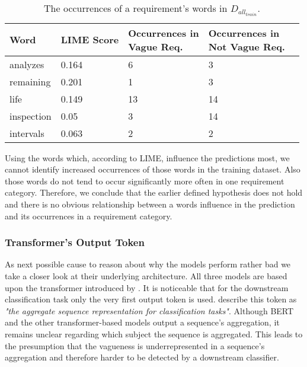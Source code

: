 \begin{table}[htpb]
    \centering
    \begin{tabular}{l | l l l l }
        \toprule
         Word & \ac{LIME} Score & \makecell{Occurrences in\\Vague Req.} & \makecell{Occurrences in\\Not Vague Req.} \\
        \hline
        analyzes & 0.164 & 6 & 3 \\
        remaining & 0.201 & 1 & 3  \\
        life & 0.149 & 13 & 14\\
        inspection & 0.05 & 3 & 14 \\
        intervals & 0.063 & 2 & 2 \\
        \bottomrule
    \end{tabular}
    \caption[Study Interpretation: Word Occurrences]{The occurrences of a requirement's words in $D_{all_{train}}$.}\label{tab:study:interpretation:LIME}
\end{table}

Using the words which, according to \ac{LIME}, influence the predictions most, we cannot identify increased occurrences of those words in the training dataset.
Also those words do not tend to occur significantly more often in one requirement category.
Therefore, we conclude that the earlier defined hypothesis does not hold and there is no obvious relationship between a words influence in the prediction and its occurrences in a requirement category.

\subsubsection{Transformer's Output Token}
\label{chp:study:sec:interpretation:subsec:causes:transformer_ouput_token}
As next possible cause to reason about why the models perform rather bad we take a closer look at their underlying architecture.
All three models are based upon the transformer introduced by \textcite{Vaswani:2017}.
It is noticeable that for the downstream classification task only the very first output token is used.
\Textcite{Devlin:2018} describe this token as \textit{"the aggregate sequence representation for classification tasks"}.
Although \ac{BERT} and the other transformer-based models output a sequence's aggregation, it remains unclear regarding which subject the sequence is aggregated.
This leads to the presumption that the vagueness is underrepresented in a sequence's aggregation and therefore harder to be detected by a downstream classifier.

